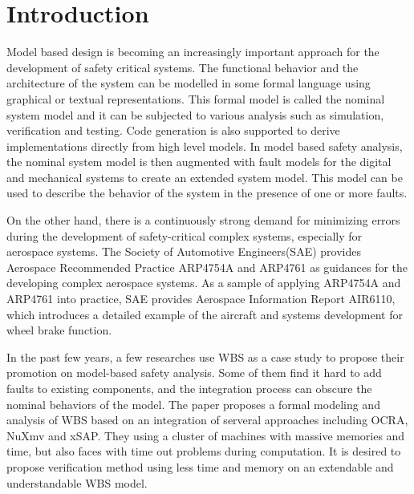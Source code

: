 \section{Introduction}
Model based design is becoming an increasingly important approach for the development of safety critical systems.
The functional behavior and the architecture of the system can be modelled in some formal language using graphical or textual representations.
This formal model is called the nominal system model and it can be subjected to various analysis such as simulation, verification and testing.
Code generation is also supported to derive implementations directly from high level models.
In model based safety analysis, the nominal system model is then augmented with fault models for the digital and mechanical systems to create an extended system model.
This model can be used to describe the behavior of the system in the presence of one or more faults.


On the other hand, there is a continuously strong demand for minimizing errors during the development of safety-critical complex systems\cite{lctes10}, especially for aerospace systems\cite{issrew12}.
The Society of Automotive Engineers(SAE) provides Aerospace Recommended Practice ARP4754A\cite{arp4754a} and ARP4761\cite{arp4761} as guidances for the developing complex aerospace systems. As a sample of applying ARP4754A and ARP4761 into practice, SAE provides Aerospace Information Report AIR6110\cite{air6110}, which introduces a detailed example of the aircraft and systems development for wheel brake function.

In the past few years, a few researches use WBS as a case study to propose their promotion on model-based safety analysis.
Some of them find it hard to add faults to existing components, and the integration process can obscure the nominal behaviors of the model.  The paper\cite{cav15} proposes a formal modeling and analysis of WBS based on an integration of serveral approaches including OCRA, NuXmv and xSAP. They using a cluster of machines with massive memories and time, but also faces with time out problems during computation. It is desired to propose verification method using less time and memory on an extendable and understandable WBS model.

